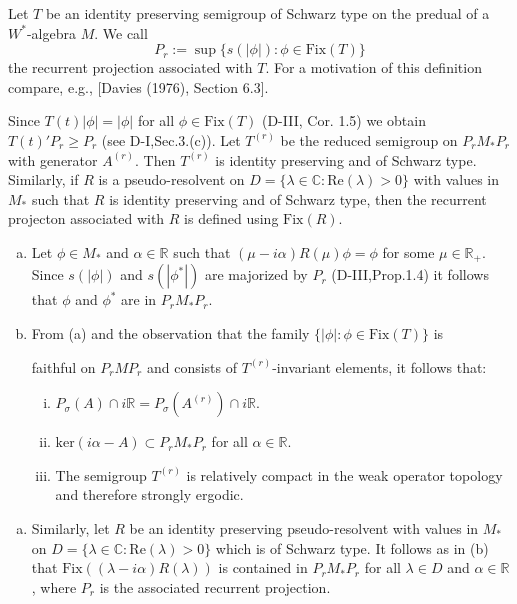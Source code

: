 Let $T$ be an identity preserving semigroup of Schwarz type on the predual of a $W^*$-algebra $M$.
We call
\[
P_{r} := \sup\{s(|\phi|) : \phi \in \text{Fix}(T)\}
\]
the recurrent projection associated with $T$.
For a motivation of this definition compare, e.g., [Davies (1976), Section 6.3].

Since $T(t)|\phi| = |\phi|$ for all $\phi \in \text{Fix}(T)$ (D-III, Cor. 1.5) we obtain $T(t)'P_{r} \geq P_{r}$ (see D-I,Sec.3.(c)).
Let $T^{(r)}$ be the reduced semigroup on $P_{r}M_{*}P_{r}$ with generator $A^{(r)}$.
Then $T^{(r)}$ is identity preserving and of Schwarz type.
Similarly, if $R$ is a pseudo-resolvent on $D = \{\lambda \in \mathbb{C} : \text{Re}(\lambda) > 0\}$ with values in $M_{*}$ such that $R$ is identity preserving and of Schwarz type, then the recurrent projecton associated with $R$ is defined using $\text{Fix}(R)$.

\begin{remark}\label{rem:d4-3-2}
\begin{enumerate}[(a)]
\item
Let $\phi \in M_{*}$ and $\alpha \in \mathbb{R}$ such that $(\mu - i\alpha)R(\mu)\phi = \phi$ for some $\mu \in \mathbb{R}_{+}$.
Since $s(|\phi|)$ and $s(|\phi^*|)$ are majorized by $P_{r}$ (D-III,Prop.1.4) it follows that $\phi$ and $\phi^*$ are in $P_{r}M_{*}P_{r}$.

\item
From (a) and the observation that the family $\{|\phi| : \phi \in \text{Fix}(T)\}$ is

\newpage

faithful on $P_{r}MP_{r}$ and consists of $T^{(r)}$-invariant elements, it follows that:

\begin{enumerate}[(i)]
\item
$P_{\sigma}(A) \cap i\mathbb{R} = P_{\sigma}(A^{(r)}) \cap i\mathbb{R}$.

\item
$\text{ker}(i\alpha - A) \subset P_{r}M_{*}P_{r}$ for all $\alpha \in \mathbb{R}$.

\item
The semigroup $T^{(r)}$ is relatively compact in the weak operator topology and therefore strongly ergodic.
\end{enumerate}
\end{enumerate}
\end{remark}

\begin{enumerate}[(c)]
\item
Similarly, let $R$ be an identity preserving pseudo-resolvent with values in $M_{*}$ on $D = \{\lambda \in \mathbb{C} : \text{Re}(\lambda) > 0\}$ which is of Schwarz type.
It follows as in (b) that $\text{Fix}((\lambda - i\alpha)R(\lambda))$ is contained in $P_{r}M_{*}P_{r}$ for all $\lambda \in D$ and $\alpha \in \mathbb{R}$, where $P_{r}$ is the associated recurrent projection.
\end{enumerate}

